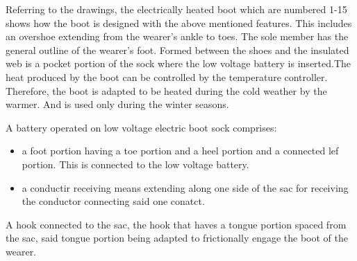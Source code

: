 \documentclass[11pt, english]{uspatent}
\begin{document}

\patentParagraph Referring to the drawings, the electrically heated boot which are numbered 1-15 shows how the boot is designed with the above mentioned features. This includes an overshoe extending from the wearer's ankle to toes. The sole member has the general outline of the wearer's foot.
\patentParagraph Formed between the shoes and the insulated web is a pocket portion of the sock where the low voltage battery is inserted.The heat produced by the boot can be controlled by the temperature controller. 
\patentParagraph Therefore, the boot is adapted to be heated during the cold weather by the warmer. And is used only during the winter seasons.

\patentClaimsStart
{}
A battery operated on low voltage electric boot sock comprises:
\begin{itemize}[label={}]
\item a foot portion having a toe portion and a heel portion and a connected lef portion. This is connected to the low voltage battery.
\item a conductir receiving means extending along one side of the sac for receiving the conductor connecting said one conatct.
\end{itemize}

A hook connected to the sac, the hook that haves a tongue portion spaced from the sac, said tongue portion being adapted to frictionally engage the boot of the wearer.

\patentClaimsEnd
\end{document}
